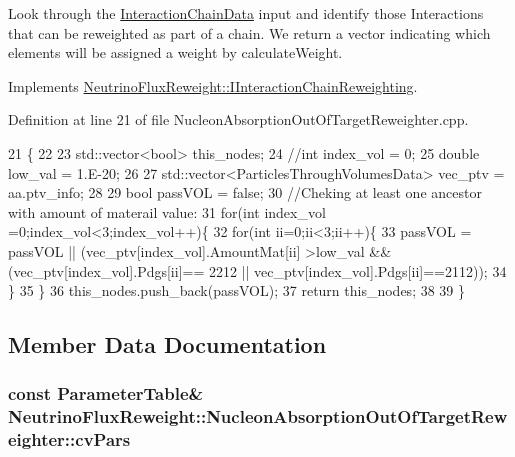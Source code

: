 Look through the \hyperlink{class_neutrino_flux_reweight_1_1_interaction_chain_data}{Interaction\-Chain\-Data} input and identify those Interactions that can be reweighted as part of a chain. We return a vector indicating which elements will be assigned a weight by calculate\-Weight. 



Implements \hyperlink{class_neutrino_flux_reweight_1_1_i_interaction_chain_reweighting_aacf17580c1d316f0ebcdfdff7418e9e3}{Neutrino\-Flux\-Reweight\-::\-I\-Interaction\-Chain\-Reweighting}.



Definition at line 21 of file Nucleon\-Absorption\-Out\-Of\-Target\-Reweighter.\-cpp.


\begin{DoxyCode}
21                                                                                                    \{
22  
23     std::vector<bool> this\_nodes;
24     \textcolor{comment}{//int index\_vol = 0;}
25     \textcolor{keywordtype}{double} low\_val = 1.E-20;    
26   
27     std::vector<ParticlesThroughVolumesData>  vec\_ptv = aa.ptv\_info;
28 
29     \textcolor{keywordtype}{bool} passVOL = \textcolor{keyword}{false};
30     \textcolor{comment}{//Cheking at least one ancestor with amount of materail value:}
31     \textcolor{keywordflow}{for}(\textcolor{keywordtype}{int} index\_vol =0;index\_vol<3;index\_vol++)\{
32       \textcolor{keywordflow}{for}(\textcolor{keywordtype}{int} ii=0;ii<3;ii++)\{
33         passVOL = passVOL || (vec\_ptv[index\_vol].AmountMat[ii] >low\_val && (vec\_ptv[index\_vol].Pdgs[ii]==
      2212 || vec\_ptv[index\_vol].Pdgs[ii]==2112));
34       \}
35     \}
36     this\_nodes.push\_back(passVOL);
37     \textcolor{keywordflow}{return} this\_nodes;
38     
39   \}
\end{DoxyCode}


\subsection{Member Data Documentation}
\hypertarget{class_neutrino_flux_reweight_1_1_nucleon_absorption_out_of_target_reweighter_a15ea8c8b728192f7f61f2f7a503ea523}{
\subsubsection[{cv\-Pars}]{\setlength{\rightskip}{0pt plus 5cm}const {\bf Parameter\-Table}\& Neutrino\-Flux\-Reweight\-::\-Nucleon\-Absorption\-Out\-Of\-Target\-Reweighter\-::cv\-Pars}}\label{class_neutrino_flux_reweight_1_1_nucleon_absorption_out_of_target_reweighter_a15ea8c8b728192f7f61f2f7a503ea523}


